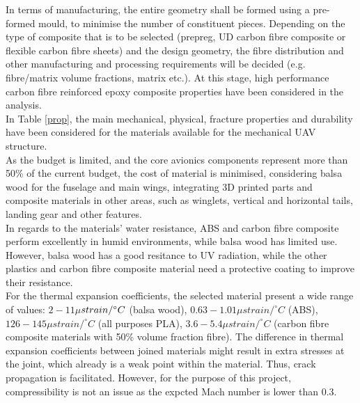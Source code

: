 \documentclass[12pt]{article}
\begin{document}
\noindent In terms of manufacturing, the entire geometry shall be formed using a pre-formed mould, to minimise the number of constituent pieces. Depending on the type of composite that is to be selected (prepreg, UD carbon fibre composite or flexible carbon fibre sheets) and the design geometry, the fibre distribution and other manufacturing and processing requirements will be decided (e.g.  fibre/matrix volume fractions, matrix etc.). At this stage, high performance carbon fibre reinforced epoxy composite properties have been considered in the analysis. \\

\noindent In Table \ref{prop}, the main mechanical, physical, fracture properties and durability have been considered for the materials available for the mechanical UAV structure. \\  

\noindent As the budget is limited, and the core avionics components represent more than 50\% of the current budget, the cost of material is minimised, considering balsa wood for the fuselage and main wings, integrating 3D printed parts and composite materials in other areas, such as winglets, vertical and horizontal tails, landing gear and other features. \\

\noindent In regards to the materials' water resistance, ABS and carbon fibre composite perform excellently in humid environments, while balsa wood has limited use. However, balsa wood has a good resitance to UV radiation, while the other plastics and carbon fibre composite material need a protective coating to improve their resistance. \\

\noindent For the thermal expansion coefficients, the selected material present a wide range of values: $2 - 11\mu$$strain/ \\ ^{\circ}C$ (balsa wood), $0.63 - 1.01\mu$$strain/^{\circ}C$ (ABS), $126 - 145\mu$$strain/^{\circ}C$ (all purposes PLA), $3.6 - 5.4\mu$$strain/ ^{\circ}C$ (carbon fibre composite materials with 50\% volume fraction fibre). The difference in thermal expansion coefficients between joined materials might result in extra stresses at the joint, which already is a weak point within the material. Thus, crack propagation is facilitated. However, for the purpose of this project, compressibility is not an issue as the expcted Mach number is lower than 0.3. \cite{MATPROPERTIESREF} \\
\end{document}
